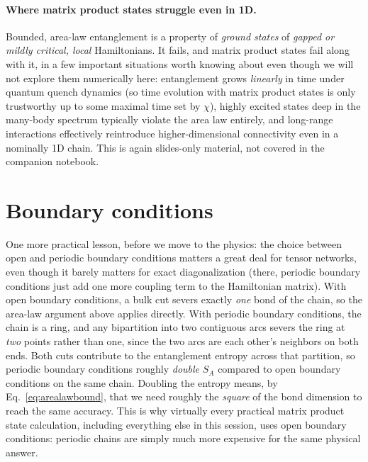 \documentclass[all_sessions.tex]{subfiles}
\begin{document}
\paragraph{Where matrix product states struggle even in 1D.} Bounded, area-law entanglement is a
property of \emph{ground states} of \emph{gapped or mildly critical, local} Hamiltonians. It fails,
and matrix product states fail along with it, in a few important situations worth knowing about
even though we will not explore them numerically here: entanglement grows \emph{linearly} in time
under quantum quench dynamics (so time evolution with matrix product states is only trustworthy up
to some maximal time set by $\chi$), highly excited states deep in the many-body spectrum typically
violate the area law entirely, and long-range interactions effectively reintroduce
higher-dimensional connectivity even in a nominally 1D chain. This is again slides-only material,
not covered in the companion notebook.

\section{Boundary conditions}
\label{sec:bc}
One more practical lesson, before we move to the physics: the choice between open and periodic
boundary conditions matters a great deal for tensor networks, even though it barely matters for
exact diagonalization (there, periodic boundary conditions just add one more coupling term to the
Hamiltonian matrix). With open boundary conditions, a bulk cut severs exactly \emph{one} bond of
the chain, so the area-law argument above applies directly. With periodic boundary conditions, the
chain is a ring, and any bipartition into two contiguous arcs severs the ring at \emph{two} points
rather than one, since the two arcs are each other's neighbors on both ends. Both cuts contribute
to the entanglement entropy across that partition, so periodic boundary conditions roughly
\emph{double} $S_A$ compared to open boundary conditions on the same chain. Doubling the entropy
means, by Eq.~\eqref{eq:arealawbound}, that we need roughly the \emph{square} of the bond dimension
to reach the same accuracy. This is why virtually every practical matrix product state calculation,
including everything else in this session, uses open boundary conditions: periodic chains are
simply much more expensive for the same physical answer.
\end{document}
